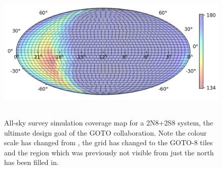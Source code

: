 \begin{colsection}
\begin{figure}[p]
    \begin{center}
        \includegraphics[height=190pt]{images/survey_sims/365_2N8+2S8_lite.png}
    \end{center}
    \caption[All-sky survey simulation results: 2N8+2S8 system]{
        All-sky survey simulation coverage map for a 2N8+2S8 system, the ultimate design goal of the GOTO collaboration. Note the colour scale has changed from , the grid has changed to the GOTO-8 tiles and the region which was previously not visible from just the north has been filled in.
    }\label{fig:survey_sim_2n8+2s8}
\end{figure}


\end{colsection}
